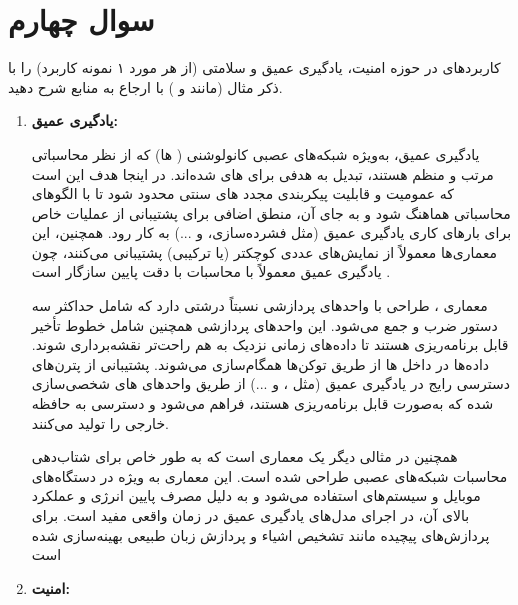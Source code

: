 \section{سوال چهارم}

کاربردهای  در حوزه امنیت، یادگیری عمیق و سلامتی (از هر مورد ۱ نمونه کاربرد) را با ذکر مثال (مانند  و ) با ارجاع به منابع شرح دهید.



\begin{qsolve}
	\begin{enumerate}
		\item \textbf{یادگیری عمیق:}
		
		
		یادگیری عمیق، به‌ویژه شبکه‌های عصبی کانولوشنی ( ها) که از نظر محاسباتی مرتب و منظم هستند، تبدیل به هدفی برای های شده‌اند. در اینجا هدف این است که عمومیت و قابلیت پیکربندی مجدد های سنتی محدود شود تا با الگوهای محاسباتی  هماهنگ شود و به جای آن، منطق اضافی برای پشتیبانی از عملیات خاص برای بارهای کاری یادگیری عمیق (مثل فشرده‌سازی،  و ...) به کار رود. همچنین، این معماری‌ها معمولاً از نمایش‌های عددی کوچکتر (یا ترکیبی) پشتیبانی می‌کنند، چون یادگیری عمیق معمولاً با محاسبات با دقت پایین سازگار است \cite{ref2}.
		
		
		معماری  \cite{ref4}، \cite{ref3} طراحی  با واحدهای پردازشی نسبتاً درشتی دارد که شامل حداکثر سه دستور ضرب و جمع می‌شود. این واحدهای پردازشی همچنین شامل خطوط تأخیر قابل برنامه‌ریزی هستند تا داده‌های زمانی نزدیک به هم راحت‌تر نقشه‌برداری شوند. داده‌ها در داخل ها از طریق توکن‌ها همگام‌سازی می‌شوند. پشتیبانی از پترن‌های دسترسی رایج در یادگیری عمیق (مثل ،  و ...) از طریق واحدهای  های شخصی‌سازی شده که به‌صورت  قابل برنامه‌ریزی هستند، فراهم می‌شود و دسترسی به حافظه خارجی را تولید می‌کنند.
		
		همچنین در مثالی دیگر  \cite{ref1} یک معماری  است که به طور خاص برای شتاب‌دهی محاسبات شبکه‌های عصبی طراحی شده است. این معماری به ویژه در دستگاه‌های موبایل و سیستم‌های  استفاده می‌شود و به دلیل مصرف پایین انرژی و عملکرد بالای آن، در اجرای مدل‌های یادگیری عمیق در زمان واقعی مفید است.  برای پردازش‌های پیچیده مانند تشخیص اشیاء و پردازش زبان طبیعی بهینه‌سازی شده است 
	
	
	
	\item \textbf{امنیت:}
	

\end{enumerate}
\end{qsolve}
